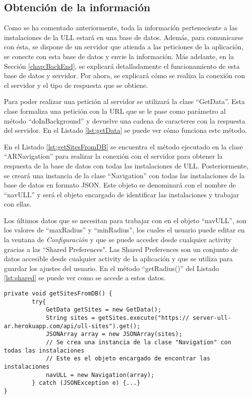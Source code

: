\subsection{Obtención de la información}

Como se ha comentado anteriormente, toda la información perteneciente a las instalaciones de la ULL estará en una base de datos. 
Además, para comunicarse con ésta, se dispone de un servidor que atienda a las peticiones de la aplicación, se conecte con esta base de datos y  envie la información. 
Más adelante, en la Sección \ref{chap:BackEnd}, se explicará detalladamente el funcionamiento de esta base de datos y servidor. Por ahora, se explicará cómo se realiza la conexión con el servidor y el tipo de respuesta que se obtiene.

Para poder realizar una petición al servidor se utilizará la clase ``GetData''. 
Esta clase formaliza una petición con la URL que se le pase como parámetro al método ``doInBackground'' y devuelve una cadena de caracteres con la respuesta del servidor. En el Listado \ref{lst:getData} se puede ver cómo funciona este método. 

 

En el Listado \ref{lst:getSitesFromDB} se encuentra el método ejecutado en la clase ``ARNavigation'' para realizar la conexión con el servidor para obtener la respuesta de la base de datos con todas las instalaciones de ULL. Posteriormente, se creará una instancia de la clase ``Navigation'' con todas las instalaciones de la base de datos en formato JSON. Este objeto se denominará con el nombre de ``navULL'' y será el objeto encargado de identificar las instalaciones y trabajar con ellas.

Los últimos datos que se necesitan para trabajar con en el objeto ``navULL'', son los valores de ``maxRadius'' y ``minRadius'', los cuales el usuario puede editar en la ventana de \textit{Configuración} y que se puede acceder desde cualquier activity gracias a las ``Shared Preferences". Las Shared Preferences son un conjunto de datos accesible desde cualquier activity de la aplicación y que se utiliza para guardar los ajustes del usuario. En el método ``getRadius()'' del Listado \ref{lst:shared} se puede ver como se accede a estos datos.

\bigskip

\begin{lstlisting}[caption={Método que conecta con el servidor y recibe la respuesta con todas las instalaciones de la base de datos.},  label={lst:getSitesFromDB}]
    private void getSitesFromDB() {
        try{
            GetData getSites = new GetData();
            String sites = getSites.execute("https:// server-ull-ar.herokuapp.com/api/ull-sites").get();
            JSONArray array = new JSONArray(sites);
            // Se crea una instancia de la clase "Navigation" con todas las instalaciones
            // Este es el objeto encargado de encontrar las instalaciones
            navULL = new Navigation(array); 
        } catch (JSONException e) {...}
}
\end{lstlisting}


